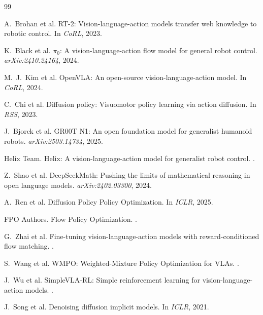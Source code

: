 \documentclass{article}
\begin{document}

\begin{thebibliography}{99}

A.~Brohan et al.
\newblock RT-2: Vision-language-action models transfer web knowledge to robotic control.
\newblock In \emph{CoRL}, 2023.

K.~Black et al.
\newblock $\pi_0$: A vision-language-action flow model for general robot control.
\newblock \emph{arXiv:2410.24164}, 2024.

M.~J.~Kim et al.
\newblock OpenVLA: An open-source vision-language-action model.
\newblock In \emph{CoRL}, 2024.

C.~Chi et al.
\newblock Diffusion policy: Visuomotor policy learning via action diffusion.
\newblock In \emph{RSS}, 2023.

J.~Bjorck et al.
\newblock GR00T N1: An open foundation model for generalist humanoid robots.
\newblock \emph{arXiv:2503.14734}, 2025.

Helix Team.
\newblock Helix: A vision-language-action model for generalist robot control.
.

Z.~Shao et al.
\newblock DeepSeekMath: Pushing the limits of mathematical reasoning in open language models.
\newblock \emph{arXiv:2402.03300}, 2024.

A.~Ren et al.
\newblock Diffusion Policy Policy Optimization.
\newblock In \emph{ICLR}, 2025.

FPO Authors.
\newblock Flow Policy Optimization.
.

G.~Zhai et al.
\newblock Fine-tuning vision-language-action models with reward-conditioned flow matching.
.

S.~Wang et al.
\newblock WMPO: Weighted-Mixture Policy Optimization for VLAs.
.

J.~Wu et al.
\newblock SimpleVLA-RL: Simple reinforcement learning for vision-language-action models.
.

J.~Song et al.
\newblock Denoising diffusion implicit models.
\newblock In \emph{ICLR}, 2021.


\end{thebibliography}
\end{document}
